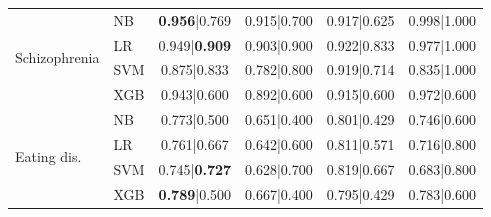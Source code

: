 \documentclass[letterpaper]{article} %
\begin{document}
\begin{table}[t]
\begin{tabular}{llcccc}
\midrule
\multirow{4}{*}{Schizophrenia}
 & NB & \textbf{0.956}|0.769 & 0.915|0.700 & 0.917|0.625 & 0.998|1.000 \\
 & LR & 0.949|\textbf{0.909} & 0.903|0.900 & 0.922|0.833 & 0.977|1.000 \\
 & SVM & 0.875|0.833 & 0.782|0.800 & 0.919|0.714 & 0.835|1.000 \\
 & XGB & 0.943|0.600 & 0.892|0.600 & 0.915|0.600 & 0.972|0.600 \\
\midrule
\multirow{4}{*}{Eating dis.}
 & NB & 0.773|0.500 & 0.651|0.400 & 0.801|0.429 & 0.746|0.600 \\
 & LR & 0.761|0.667 & 0.642|0.600 & 0.811|0.571 & 0.716|0.800 \\
 & SVM & 0.745|\textbf{0.727} & 0.628|0.700 & 0.819|0.667 & 0.683|0.800 \\
 & XGB & \textbf{0.789}|0.500 & 0.667|0.400 & 0.795|0.429 & 0.783|0.600 \\
\bottomrule
\end{tabular}
\end{table}
\end{document}

